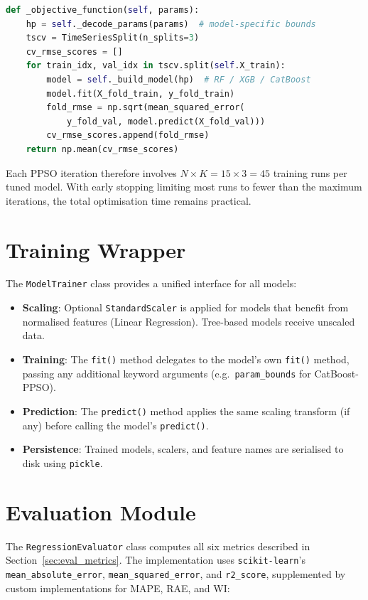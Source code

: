 \begin{lstlisting}[language=Python, caption={PPSO objective function (fitness evaluation).}, label={lst:ppso_obj}]
def _objective_function(self, params):
    hp = self._decode_params(params)  # model-specific bounds
    tscv = TimeSeriesSplit(n_splits=3)
    cv_rmse_scores = []
    for train_idx, val_idx in tscv.split(self.X_train):
        model = self._build_model(hp)  # RF / XGB / CatBoost
        model.fit(X_fold_train, y_fold_train)
        fold_rmse = np.sqrt(mean_squared_error(
            y_fold_val, model.predict(X_fold_val)))
        cv_rmse_scores.append(fold_rmse)
    return np.mean(cv_rmse_scores)
\end{lstlisting}

Each PPSO iteration therefore involves $N \times K = 15 \times 3 = 45$ training runs per tuned model. With early stopping limiting most runs to fewer than the maximum iterations, the total optimisation time remains practical.


\section{Training Wrapper}

The \texttt{ModelTrainer} class provides a unified interface for all models:

\begin{itemize}
    \item \textbf{Scaling}: Optional \texttt{StandardScaler} is applied for models that benefit from normalised features (Linear Regression). Tree-based models receive unscaled data.
    \item \textbf{Training}: The \texttt{fit()} method delegates to the model's own \texttt{fit()} method, passing any additional keyword arguments (e.g.\ \texttt{param\_bounds} for CatBoost-PPSO).
    \item \textbf{Prediction}: The \texttt{predict()} method applies the same scaling transform (if any) before calling the model's \texttt{predict()}.
    \item \textbf{Persistence}: Trained models, scalers, and feature names are serialised to disk using \texttt{pickle}.
\end{itemize}


\section{Evaluation Module}

The \texttt{RegressionEvaluator} class computes all six metrics described in Section~\ref{sec:eval_metrics}. The implementation uses \texttt{scikit-learn}'s \texttt{mean\_absolute\_error}, \texttt{mean\_squared\_error}, and \texttt{r2\_score}, supplemented by custom implementations for MAPE, RAE, and WI:

